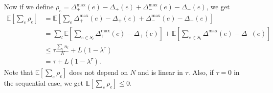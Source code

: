 Now if we define $\rho_e = \Delta_+^{\max}(e) - \Delta_+(e) + \Delta_-^{\max}(e) - \Delta_-(e)$, we get
\begin{align*}
\mathbb{E}\left[\sum_e \rho_e\right]
&= \mathbb{E}\left[\sum_e \Delta_+^{\max}(e) - \Delta_+(e) + \Delta_-^{\max}(e) - \Delta_-(e) \right]\\
&= \sum_l \mathbb{E}\left[\sum_{e\in S_l} \Delta_+^{\max}(e) - \Delta_+(e)\right] + \mathbb{E}\left[\sum_{e\in S_l} \Delta_-^{\max}(e) - \Delta_-(e) \right]\\
&\leq \tau\frac{\sum_l n_l}{N} + L(1-\lambda^\tau)\\
&= \tau + L(1-\lambda^\tau).
\end{align*}
Note that $\mathbb{E}\left[\sum_e \rho_e\right]$ does not depend on $N$ and is linear in $\tau$.
Also, if $\tau=0$ in the sequential case, we get $\mathbb{E}\left[\sum_e \rho_e\right] \leq 0$.

